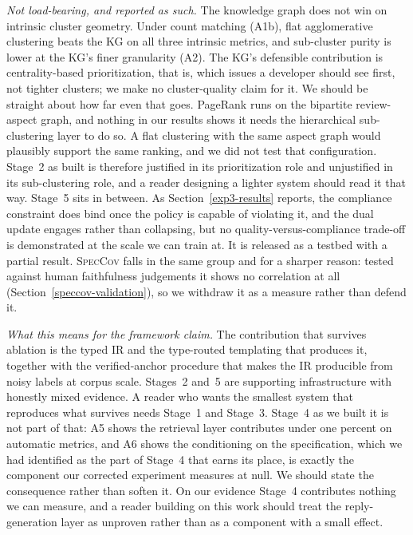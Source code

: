 \documentclass[sigconf, anonymous]{acmart}
\begin{document}
\emph{Not load-bearing, and reported as such.} The knowledge graph does not win on intrinsic
cluster geometry. Under count matching (A1b), flat agglomerative clustering beats the KG on all
three intrinsic metrics, and sub-cluster purity is lower at the KG's finer granularity (A2).
The KG's defensible contribution is centrality-based prioritization, that is, which issues a
developer should see first, not tighter clusters; we make no cluster-quality claim for it. We
should be straight about how far even that goes. PageRank runs on the bipartite review-aspect
graph, and nothing in our results shows it needs the hierarchical sub-clustering layer to do so.
A flat clustering with the same aspect graph would plausibly support the same ranking, and we did
not test that configuration. Stage~2 as built is therefore justified in its prioritization role
and unjustified in its sub-clustering role, and a reader designing a lighter system should read
it that way.
Stage~5 sits in between. As Section~\ref{exp3-results} reports, the compliance constraint does
bind once the policy is capable of violating it, and the dual update engages rather than
collapsing, but no quality-versus-compliance trade-off is demonstrated at the scale we can train
at. It is released as a testbed with a partial result.
\textsc{SpecCov} falls in the same group and for a sharper reason: tested against human
faithfulness judgements it shows no correlation at all (Section~\ref{speccov-validation}), so we
withdraw it as a measure rather than defend it.

\emph{What this means for the framework claim.} The contribution that survives ablation is the
typed IR and the type-routed templating that produces it, together with the verified-anchor
procedure that makes the IR producible from noisy labels at corpus scale. Stages~2 and~5 are
supporting infrastructure with honestly mixed evidence. A reader who wants the smallest system that reproduces what survives needs Stage~1 and Stage~3.
Stage~4 as we built it is not part of that: A5 shows the retrieval layer contributes under one
percent on automatic metrics, and A6 shows the conditioning on the specification, which we had
identified as the part of Stage~4 that earns its place, is exactly the component our corrected
experiment measures at null. We should state the consequence rather than soften it. On our
evidence Stage~4 contributes nothing we can measure, and a reader building on this work should
treat the reply-generation layer as unproven rather than as a component with a small effect.
\end{document}
